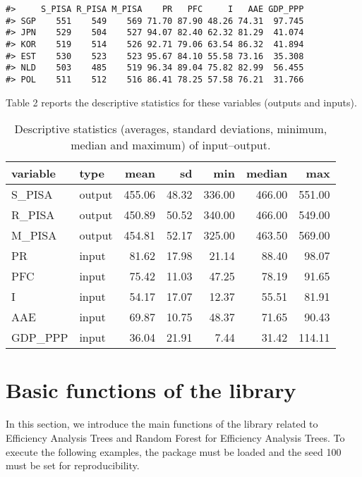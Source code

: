 \begin{verbatim}
#>     S_PISA R_PISA M_PISA    PR   PFC     I   AAE GDP_PPP
#> SGP    551    549    569 71.70 87.90 48.26 74.31  97.745
#> JPN    529    504    527 94.07 82.40 62.32 81.29  41.074
#> KOR    519    514    526 92.71 79.06 63.54 86.32  41.894
#> EST    530    523    523 95.67 84.10 55.58 73.16  35.308
#> NLD    503    485    519 96.34 89.04 75.82 82.99  56.455
#> POL    511    512    516 86.41 78.25 57.58 76.21  31.766
\end{verbatim}

Table 2 reports the descriptive statistics for these variables (outputs and inputs).

\begin{table}

\caption{\label{tab:descr-lat}Descriptive statistics (averages, standard deviations, minimum, median and maximum) of input–output.}
\centering
\fontsize{7}{9}\selectfont
\begin{tabular}[t]{l|l|r|r|r|r|r}
\hline
variable & type & mean & sd & min & median & max\\
\hline
S\_PISA & output & 455.06 & 48.32 & 336.00 & 466.00 & 551.00\\
\hline
R\_PISA & output & 450.89 & 50.52 & 340.00 & 466.00 & 549.00\\
\hline
M\_PISA & output & 454.81 & 52.17 & 325.00 & 463.50 & 569.00\\
\hline
PR & input & 81.62 & 17.98 & 21.14 & 88.40 & 98.07\\
\hline
PFC & input & 75.42 & 11.03 & 47.25 & 78.19 & 91.65\\
\hline
I & input & 54.17 & 17.07 & 12.37 & 55.51 & 81.91\\
\hline
AAE & input & 69.87 & 10.75 & 48.37 & 71.65 & 90.43\\
\hline
GDP\_PPP & input & 36.04 & 21.91 & 7.44 & 31.42 & 114.11\\
\hline
\end{tabular}
\end{table}

\hypertarget{section4}{%
\section{Basic functions of the library}\label{section4}}

In this section, we introduce the main functions of the library related to Efficiency Analysis Trees and Random Forest for Efficiency Analysis Trees. To execute the following examples, the package  must be loaded and the seed 100 must be set for reproducibility.

